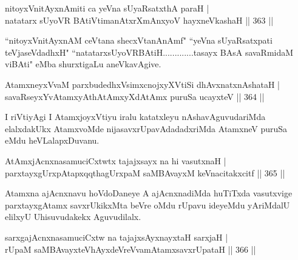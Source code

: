 \begin{shl}
nitoyxV\s nitAyxnAmiti ca yeVna sUyaRsatxthA paraH | \\
natatarx sUyoVR BAtiVtimanAtxrXmAnxyoV hayxneVkashaH \hfill||  363 || 
\end{shl}


\begin{artha}
``nitoyxV\s nitAyxnAM ceVtana shecxVtanAnAmf" ``yeVna sUyaRsatxpati teVjaseVdadhxH" ``natatarxsUyoVRBAtiH.............tasayx BAsA savaRmidaM viBAti" eMba shurxtigaLu aneVkavAgive.
\end{artha}

\begin{shl}
AtamxneyxVvaM parxbudedhxV\s simxcnojxyXVtiSi dhAvxnatxnAshataH | \\
savaRseyxYvA\s \s tamxyAthAtAmxyXdAtAmx puruSa ucayxteV \hfill||  364 ||  
\end{shl}

\begin{artha}
I riVtiyAgi I AtamxjoyxVtiyu iralu katatxleyu nAshavAguvudariMda elalxdakUkx AtamxvoMde nijasavxrUpavAdadadxriMda AtamxneV puruSa eMdu heVLalapxDuvanu.
\end{artha}


\begin{shl}
AtAmxjAcnxnasamuciCxtwtx tajajxsayx na hi vasutxnaH | \\
parxtayxgUrxpAtapxqqthagUrxpaM saMBAvayxM keVnacitakxcitf \hfill||  365 ||  
\end{shl}

\begin{artha}
Atamxna ajAcnxnavu hoVdoDaneye A ajAcnxnadiMda huTiTxda vasutxvige parxtayxgAtamx savxrUkikxMta beVre oMdu rUpavu ideyeMdu yAriMdalU elilxyU Uhisuvudakekx Aguvudilalx.
\end{artha}


\begin{shl}
sarxgajAcnxnasamuciCxtw na tajajxsAyxnayxtaH sarxjaH | \\
rUpaM saMBAvayxteV\s hAyxdeVreVvamAtamxsavxrUpataH \hfill||  366 ||  
\end{shl}
				
